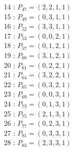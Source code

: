 \documentclass{article}
\begin{document}
{\begin{multicols}{3}
14 : $P_{47}=( 2, 2, 1, 1 )$\\
15 : $P_{49}=( 0, 3, 1, 1 )$\\
16 : $P_{52}=( 3, 3, 1, 1 )$\\
17 : $P_{53}=( 0, 0, 2, 1 )$\\
18 : $P_{57}=( 0, 1, 2, 1 )$\\
19 : $P_{60}=( 3, 1, 2, 1 )$\\
20 : $P_{61}=( 0, 2, 2, 1 )$\\
21 : $P_{64}=( 3, 2, 2, 1 )$\\
22 : $P_{65}=( 0, 3, 2, 1 )$\\
23 : $P_{69}=( 0, 0, 3, 1 )$\\
24 : $P_{73}=( 0, 1, 3, 1 )$\\
25 : $P_{75}=( 2, 1, 3, 1 )$\\
26 : $P_{77}=( 0, 2, 3, 1 )$\\
27 : $P_{81}=( 0, 3, 3, 1 )$\\
28 : $P_{83}=( 2, 3, 3, 1 )$\\
\end{multicols}


%


%


}%
\end{document}
